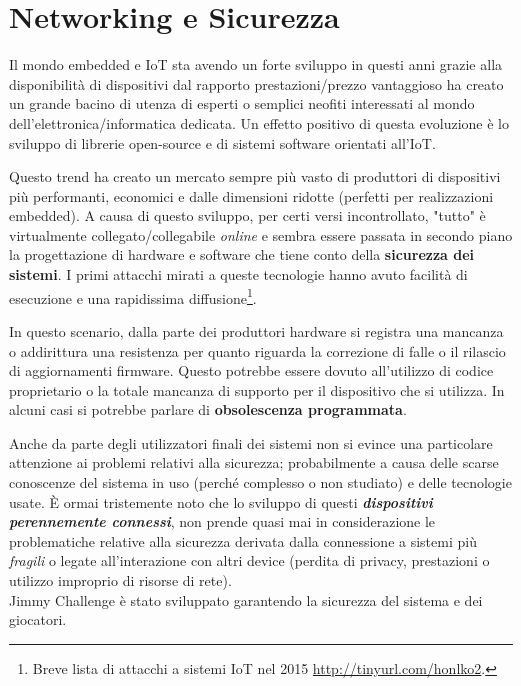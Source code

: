 \section{Networking e Sicurezza}

Il mondo embedded e IoT sta avendo un forte sviluppo in questi anni grazie alla disponibilità di dispositivi dal rapporto prestazioni/prezzo vantaggioso ha creato un grande bacino di utenza di esperti o semplici neofiti interessati al mondo dell'elettronica/informatica dedicata. Un effetto positivo di questa evoluzione è lo sviluppo di librerie open-source e di sistemi software orientati all'IoT.

Questo trend ha creato un mercato sempre più vasto di produttori di dispositivi più performanti, economici e dalle dimensioni ridotte (perfetti per realizzazioni embedded).
A causa di questo sviluppo, per certi versi incontrollato, "tutto" è virtualmente collegato/collegabile \textit{online} e sembra essere passata in secondo piano la progettazione di hardware e software che tiene conto della \textbf{sicurezza dei sistemi}. I primi attacchi mirati a queste tecnologie hanno avuto facilità di esecuzione e una rapidissima diffusione\footnote{Breve lista di attacchi a sistemi IoT nel 2015 \url{http://tinyurl.com/honlko2}.}.

In questo scenario, dalla parte dei produttori hardware si registra una mancanza o addirittura una resistenza per quanto riguarda la correzione di falle o il rilascio di aggiornamenti firmware. Questo potrebbe essere dovuto all'utilizzo di codice proprietario o la totale mancanza di supporto per il dispositivo che si utilizza. In alcuni casi si potrebbe parlare di \textbf{obsolescenza programmata}.

Anche da parte degli utilizzatori finali dei sistemi non si evince una particolare attenzione ai problemi relativi alla sicurezza; probabilmente a causa delle scarse conoscenze del sistema in uso (perché complesso o non studiato) e delle tecnologie usate. È ormai tristemente noto che lo sviluppo di questi \textbf{\textit{dispositivi perennemente connessi}}, non prende quasi mai in considerazione le problematiche relative alla sicurezza derivata dalla connessione a sistemi più \textit{fragili} o legate all'interazione con altri device (perdita di privacy, prestazioni o utilizzo improprio di risorse di rete).\\

Jimmy Challenge è stato sviluppato garantendo la sicurezza del sistema e dei giocatori.\\

